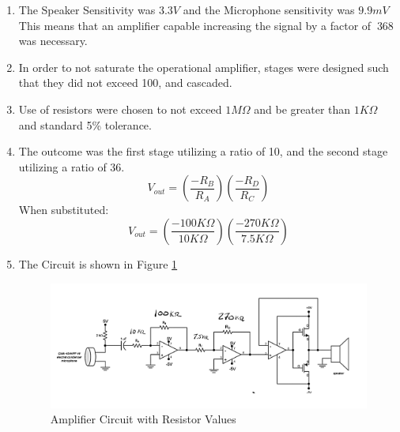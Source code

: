 \documentclass[12pt]{article}
\begin{document}
\begin{enumerate}
	\item The Speaker Sensitivity was \(3.3V\) and the Microphone sensitivity was
	      \(9.9mV\) This means that an amplifier capable increasing the signal by
	      a factor of \(~368\) was necessary.
	\item In order to not saturate the operational amplifier, stages were
	      designed such that they did not exceed 100, and cascaded.
	\item Use of resistors were chosen to not exceed \(1M\Omega\) and be
	      greater than \(1K\Omega\) and standard 5\% tolerance.
	\item The outcome was the first stage utilizing a ratio of 10, and the
	      second stage utilizing a ratio of 36.
	      \[
		      V_{out} = (\frac{-R_B}{R_A})(\frac{-R_D}{R_C})
	      \]
	      When substituted:
	      \[
		      V_{out} =
		      (\frac{-100K\Omega}{10K\Omega})(\frac{-270K\Omega}{7.5K\Omega})
	      \]

	\item The Circuit is shown in Figure \ref{fig:amp}
	      \begin{figure}[H]
		      \centering
		      \includegraphics[width=16cm]{04_09}
		      \caption{Amplifier Circuit with Resistor Values}
		      \label{fig:amp}
	      \end{figure}
\end{enumerate}
\end{document}
